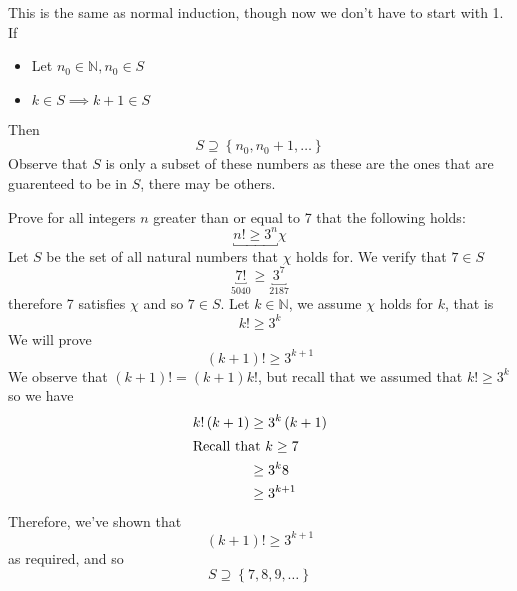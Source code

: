 \documentclass[11pt]{book}
\begin{document}
\newpage

\begin{defn}\label{defn:extended_principle_of_mathmatical_induction_}
    This is the same as normal induction, though now we don't have to start with 1.
    If  
    \begin{itemize}
        \item Let $n_{0} \in \mathbb{N} , n_{0} \in S$
        \item $k \in S \implies k + 1 \in S$ 
    \end{itemize}
    Then
    \[
    \boxed{S \supseteq \left\{ n_{0} , n_{0}  + 1, \ldots  \right\}  }
    \]
    Observe that $S$ is only a subset of these numbers as these are the ones that are guarenteed to be in $S$, there may be others. 
\end{defn}

\begin{eg}
    Prove for all integers $n$ greater than or equal to 7 that the following holds:
    \[
        \underbracket{ n! \ge 3^{n} }{\chi}
    \]
    Let $S$ be the set of all natural numbers that $\chi $ holds for. We verify that $7 \in S$ 
    \[
    \underbracket{7!}_{5040} \ge \underbracket{3^{7} }_{2187} 
    \]
    therefore 7 satisfies $\chi$ and so $7 \in S$.
    Let $k \in \mathbb{N} $,  we assume $\chi$ holds for $k$, that is 
    \[
    k! \ge 3^{k} 
    \]
    We will prove 
    \[
        \left( k + 1 \right) ! \ge 3^{k + 1} 
    \]
    We observe that $\left( k + 1 \right) ! = \left( k + 1 \right) k!$, but recall that we assumed that $k! \ge 3^{k} $ so we have 
    \begin{align*}
        k!\left( k + 1 \right) &\ge 3^{k} \left( k + 1 \right) \\
        \intertext{Recall that $k\ge 7$ }
        &\ge 3^{k} 8   \\ 
        &\ge 3^{k + 1}
    \end{align*}
    Therefore, we've shown that
    \[
        \left( k + 1 \right) ! \ge 3^{k + 1} 
    \]
    as required, and so 
    \[
    S \supseteq \left\{ 7, 8, 9, \ldots  \right\} 
    \]
    
\end{eg}


\end{document}
